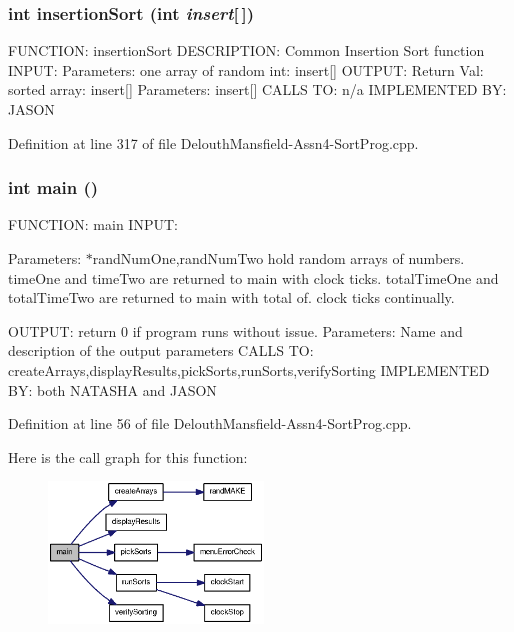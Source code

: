 \hypertarget{_delouth_mansfield-_assn4-_sort_prog_8cpp_abdd451b9bf57eb321b817db4405d65fd}{
\subsubsection[{insertionSort}]{\setlength{\rightskip}{0pt plus 5cm}int insertionSort (int {\em insert}\mbox{[}$\,$\mbox{]})}}
\label{_delouth_mansfield-_assn4-_sort_prog_8cpp_abdd451b9bf57eb321b817db4405d65fd}
FUNCTION: insertionSort DESCRIPTION: Common Insertion Sort function INPUT: Parameters: one array of random int: insert\mbox{[}\mbox{]} OUTPUT: Return Val: sorted array: insert\mbox{[}\mbox{]} Parameters: insert\mbox{[}\mbox{]} CALLS TO: n/a IMPLEMENTED BY: JASON 

Definition at line 317 of file DelouthMansfield-\/Assn4-\/SortProg.cpp.

\hypertarget{_delouth_mansfield-_assn4-_sort_prog_8cpp_ae66f6b31b5ad750f1fe042a706a4e3d4}{
\subsubsection[{main}]{\setlength{\rightskip}{0pt plus 5cm}int main ()}}
\label{_delouth_mansfield-_assn4-_sort_prog_8cpp_ae66f6b31b5ad750f1fe042a706a4e3d4}
FUNCTION: main INPUT:

Parameters: $\ast$randNumOne,randNumTwo hold random arrays of numbers. timeOne and timeTwo are returned to main with clock ticks. totalTimeOne and totalTimeTwo are returned to main with total of. clock ticks continually.

OUTPUT: return 0 if program runs without issue. Parameters: Name and description of the output parameters CALLS TO: createArrays,displayResults,pickSorts,runSorts,verifySorting IMPLEMENTED BY: both NATASHA and JASON 

Definition at line 56 of file DelouthMansfield-\/Assn4-\/SortProg.cpp.



Here is the call graph for this function:\nopagebreak
\begin{figure}[H]
\begin{center}
\leavevmode
\includegraphics[width=162pt]{_delouth_mansfield-_assn4-_sort_prog_8cpp_ae66f6b31b5ad750f1fe042a706a4e3d4_cgraph}
\end{center}
\end{figure}


